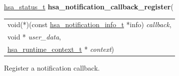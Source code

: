 \documentclass[final]{book}
\newcommand{\hsaarg}[1]{\textit{#1}}
\begin{document}
\begin{appendices}
\noindent\begin{tcolorbox}[breakable,nobeforeafter,colframe=white,colback=lightgray,left=0mm]
\hyperlink{group--status-1gad755322e7ff95456520e8abdbe90d225}{hsa_status_t} \hypertarget{group--status-1ga45cd274e6ebdd03ed401e28cc85c29c5}{\textbf{hsa_notification_callback_register}}(
\vspace{-3.5mm}\begin{longtable}{@{}p{\textwidth}}
\hspace{1.7em}void(*)(const \hyperlink{group--status-1ga46fc2648e5bde0dfc932de4acb246d82}{hsa_notification_info_t} *info) \hsaarg{callback},\\
\hspace{1.7em}void * \hsaarg{user_data},\\
\hspace{1.7em}\hyperlink{group--context-1ga0296b674c03f1a65fa8ef91e2f0ad44d}{hsa_runtime_context_t} * \hsaarg{context})\end{longtable}

\end{tcolorbox}
Register a notification callback.


\end{appendices}
\end{document}
